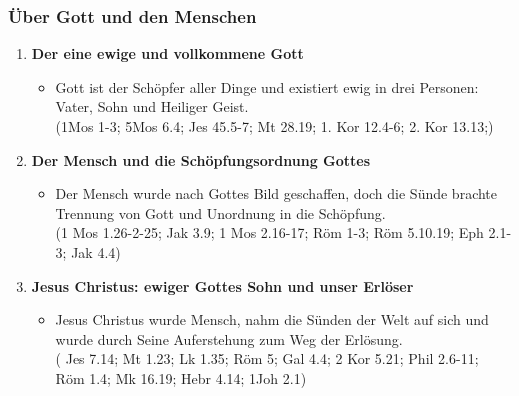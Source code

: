 \documentclass[aspectratio=43]{beamer}
\begin{document}
\begin{frame}
    \frametitle{Über Gott und den Menschen}  %
    \vspace{0.80cm}
    \begin{enumerate}
        \item \textbf{Der eine ewige und vollkommene Gott}
            \begin{itemize}              
                \item Gott ist der Schöpfer aller Dinge und existiert ewig in drei Personen: Vater, Sohn und Heiliger Geist.\\
                (1Mos 1-3; 5Mos 6.4; Jes 45.5-7; Mt 28.19; 1. Kor 12.4-6; 2. Kor 13.13;)                
            \end{itemize}
            \pause
            \vspace{0.20cm}
        \item \textbf{Der Mensch und die Schöpfungsordnung Gottes}
            \begin{itemize}
                \item Der Mensch wurde nach Gottes Bild geschaffen, doch die Sünde brachte Trennung von Gott und Unordnung in die Schöpfung.\\
                (1 Mos 1.26-2-25; Jak 3.9; 1 Mos 2.16-17; Röm 1-3; Röm 5.10.19; Eph 2.1-3; Jak 4.4)
            \end{itemize}
            \pause
            \vspace{0.20cm}
        \item \textbf{Jesus Christus: ewiger Gottes Sohn und unser Erlöser}
            \begin{itemize}
                \item Jesus Christus wurde Mensch, nahm die Sünden der Welt auf sich und wurde durch Seine Auferstehung zum Weg der Erlösung.\\
                ( Jes 7.14; Mt 1.23; Lk 1.35; Röm 5; Gal 4.4; 2 Kor 5.21; Phil 2.6-11; Röm 1.4; Mk 16.19; Hebr 4.14; 1Joh 2.1)
            \end{itemize}              
    \end{enumerate}   
\end{frame}
\end{document}
